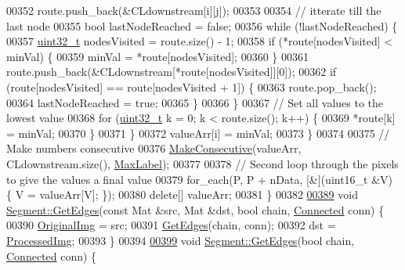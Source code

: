 \begin{DoxyCode}
00352       route.push\_back(&CLdownstream[i][j]);
00353 
00354       \textcolor{comment}{// itterate till the last node}
00355       \textcolor{keywordtype}{bool} lastNodeReached = \textcolor{keyword}{false};
00356       \textcolor{keywordflow}{while} (!lastNodeReached) \{
00357         \hyperlink{_soil_math_types_8h_a435d1572bf3f880d55459d9805097f62}{uint32\_t} nodesVisited = route.size() - 1;
00358         \textcolor{keywordflow}{if} (*route[nodesVisited] < minVal) \{
00359           minVal = *route[nodesVisited];
00360         \}
00361         route.push\_back(&CLdownstream[*route[nodesVisited]][0]);
00362         \textcolor{keywordflow}{if} (route[nodesVisited] == route[nodesVisited + 1]) \{
00363           route.pop\_back();
00364           lastNodeReached = \textcolor{keyword}{true};
00365         \}
00366       \}
00367       \textcolor{comment}{// Set all values to the lowest value}
00368       \textcolor{keywordflow}{for} (\hyperlink{_soil_math_types_8h_a435d1572bf3f880d55459d9805097f62}{uint32\_t} k = 0; k < route.size(); k++) \{
00369         *route[k] = minVal;
00370       \}
00371     \}
00372     valueArr[i] = minVal;
00373   \}
00374 
00375   \textcolor{comment}{// Make numbers consecutive}
00376   \hyperlink{class_vision_1_1_segment_ad1d04c97a79dbbf1cf10e8587985e5e5}{MakeConsecutive}(valueArr, CLdownstream.size(), \hyperlink{class_vision_1_1_segment_a22d2a688de65f4d25b164f8b2a03f4a9}{MaxLabel});
00377 
00378   \textcolor{comment}{// Second loop through the pixels to give the values a final value}
00379   for\_each(P, P + nData, [&](uint16\_t &V) \{ V = valueArr[V]; \});
00380   \textcolor{keyword}{delete}[] valueArr;
00381 \}
00382 
\hypertarget{_segment_8cpp_source_l00389}{}\hyperlink{class_vision_1_1_segment_a427f6a51ce04127927ae60d8b9ba8e12}{00389} \textcolor{keywordtype}{void} \hyperlink{class_vision_1_1_segment_ad002015511d2d8a4d42106c14e163623}{Segment::GetEdges}(\textcolor{keyword}{const} Mat &src, Mat &dst, \textcolor{keywordtype}{bool} chain, 
      \hyperlink{class_vision_1_1_segment_a330240c08320e72270fac0aa83d5e27e}{Connected} conn) \{
00390   \hyperlink{class_vision_1_1_image_processing_a77c370dab270158a4e9c634e2d3f48e7}{OriginalImg} = src;
00391   \hyperlink{class_vision_1_1_segment_ad002015511d2d8a4d42106c14e163623}{GetEdges}(chain, conn);
00392   dst = \hyperlink{class_vision_1_1_image_processing_aa7d65742882cd1b2a1e4e9cb68809211}{ProcessedImg};
00393 \}
00394 
\hypertarget{_segment_8cpp_source_l00399}{}\hyperlink{class_vision_1_1_segment_ad002015511d2d8a4d42106c14e163623}{00399} \textcolor{keywordtype}{void} \hyperlink{class_vision_1_1_segment_ad002015511d2d8a4d42106c14e163623}{Segment::GetEdges}(\textcolor{keywordtype}{bool} chain, \hyperlink{class_vision_1_1_segment_a330240c08320e72270fac0aa83d5e27e}{Connected} conn) \{

\end{DoxyCode}
